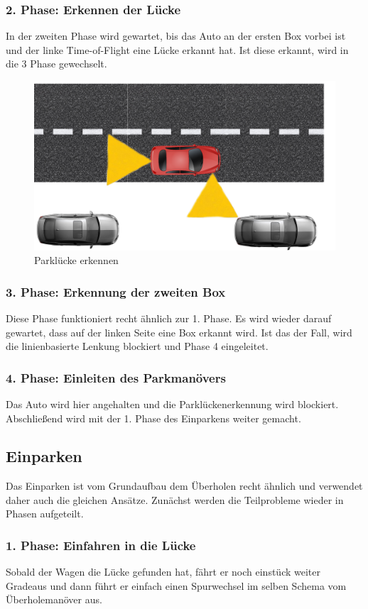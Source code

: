 \subsubsection{2. Phase: Erkennen der Lücke}
In der zweiten Phase wird gewartet, bis das Auto an der ersten Box vorbei ist und der linke Time-of-Flight eine Lücke erkannt hat. Ist diese erkannt, wird in die 3 Phase gewechselt.
\begin{figure}[H]
	\centering	
	\includegraphics[width=.5\textwidth]{img/Parken}
	\caption[Parklücke erkennen]{Parklücke erkennen}
	\label{fig:Parken}
\end{figure}

\subsubsection{3. Phase: Erkennung der zweiten Box}
Diese Phase funktioniert recht ähnlich zur 1. Phase. Es wird wieder darauf gewartet, dass auf der linken Seite eine Box erkannt wird. Ist das der Fall, wird die linienbasierte Lenkung blockiert und Phase 4 eingeleitet.



\subsubsection{4. Phase: Einleiten des Parkmanövers}
Das Auto wird hier angehalten und die Parklückenerkennung wird blockiert. Abschließend wird mit der 1. Phase des Einparkens weiter gemacht.


\subsection{Einparken}
Das Einparken ist vom Grundaufbau dem Überholen recht ähnlich und verwendet daher auch die gleichen Ansätze. Zunächst werden die Teilprobleme wieder in Phasen aufgeteilt. 

\subsubsection{1. Phase: Einfahren in die Lücke}
Sobald der Wagen die Lücke gefunden hat, fährt er noch einstück weiter Gradeaus und dann führt er einfach einen Spurwechsel im selben Schema vom Überholemanöver aus.

